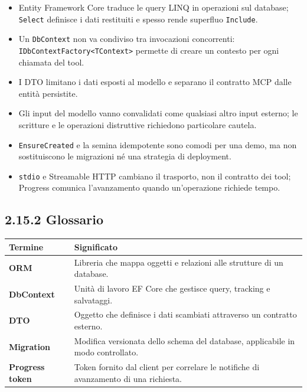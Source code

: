\documentclass[
  italian,
  10pt,
]{book}
\newcounter{none} %
\providecommand{\tightlist}{%
  \setlength{\itemsep}{0pt}\setlength{\parskip}{0pt}}
\begin{document}
\begin{itemize}
\tightlist
\item
  Entity Framework Core traduce le query LINQ in operazioni sul
  database; \texttt{Select} definisce i dati restituiti e spesso rende
  superfluo \texttt{Include}.
\item
  Un \texttt{DbContext} non va condiviso tra invocazioni concorrenti:
  \texttt{IDbContextFactory\textless{}TContext\textgreater{}} permette
  di creare un contesto per ogni chiamata del tool.
\item
  I DTO limitano i dati esposti al modello e separano il contratto MCP
  dalle entità persistite.
\item
  Gli input del modello vanno convalidati come qualsiasi altro input
  esterno; le scritture e le operazioni distruttive richiedono
  particolare cautela.
\item
  \texttt{EnsureCreated} e la semina idempotente sono comodi per una
  demo, ma non sostituiscono le migrazioni né una strategia di
  deployment.
\item
  \texttt{stdio} e Streamable HTTP cambiano il trasporto, non il
  contratto dei tool; Progress comunica l'avanzamento quando
  un'operazione richiede tempo.
\end{itemize}

\subsection{2.15.2 Glossario}\label{glossario}

{\def\LTcaptype{none} %
\begin{longtable}[]{@{}
  >{\raggedright\arraybackslash}p{}
  >{\raggedright\arraybackslash}p{}@{}}
\toprule\noalign{}
\begin{minipage}[b]{\linewidth}\raggedright
Termine
\end{minipage} & \begin{minipage}[b]{\linewidth}\raggedright
Significato
\end{minipage} \\
\midrule\noalign{}
\endhead
\bottomrule\noalign{}
\endlastfoot
\textbf{ORM} & Libreria che mappa oggetti e relazioni alle strutture di
un database. \\
\textbf{DbContext} & Unità di lavoro EF Core che gestisce query,
tracking e salvataggi. \\
\textbf{DTO} & Oggetto che definisce i dati scambiati attraverso un
contratto esterno. \\
\textbf{Migration} & Modifica versionata dello schema del database,
applicabile in modo controllato. \\
\textbf{Progress token} & Token fornito dal client per correlare le
notifiche di avanzamento di una richiesta. \\
\end{longtable}
}
\end{document}
